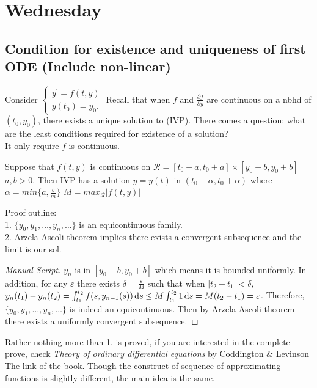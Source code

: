 

\section{Wednesday}
\subsection{Condition for existence and uniqueness of first ODE (Include non-linear)}Consider $\left \{	\begin{gathered}
y^\prime=f(t,y)	\\
y(t_0)=y_0.
\end{gathered}\right.$ Recall that when $f$ and $\frac{\partial f}{\partial y}$ are continuous on a nbhd of $(t_0,y_0)$, there exists a unique solution to (IVP).
There comes a question: what are the least conditions required for existence of a solution?\\ It only require $f$ is continuous.\\
\begin{theorem}
Suppose that $f(t,y)$ is continuous on $\mathcal{R}=[t_0-a,t_0+a]\times[y_0-b,y_0+b]$ $a,b>0$. Then IVP has a solution $y=y(t)$ in $(t_0-\alpha,t_0+\alpha)$ where $\alpha=min\{a,\frac{b}{m}\}$ $M=max_\mathcal{R}|f(t,y)|$
\end{theorem}

Proof outline:\\
1. $\{y_0, y_1, \dots, y_n,\dots\}$ is an equicontinuous family.\\
2. Arzela-Ascoli theorem implies there exists a convergent subsequence and the limit is our sol.

\begin{proof}[Manual Script]
$y_n$ is in $[y_0-b,y_0+b]$ which means it is bounded uniformly. In addition, for any $\varepsilon$ there exists $\delta=\frac{\varepsilon}{M}$ such that when $|t_2-t_1|<\delta$, $y_n(t_1)-y_n(t_2)=\int_{t_1}^{t_2}f(s,y_{n-1}(s))\,\mathrm{d} s\leq M\int_{t_1}^{t_2}1\,\mathrm{d} s=M(t_2-t_1)=\varepsilon$. Therefore, $\{y_0,y_1,\dots,y_n,\dots\}$ is indeed an equicontinuous. Then by Arzela-Ascoli theorem there exists a uniformly convergent subsequence.
\end{proof}
Rather nothing more than 1. is proved, if you are interested in the complete prove, check {\it Theory of ordinary differential equations} by Coddington \& Levinson \href{https://ptvtpqa.files.wordpress.com/2013/12/coddington-e-levinson-n-theory-of-ordinary-differential-equations.pdf}{The link of the book}.
Though the construct of sequence of approximating functions is slightly different, the main idea is the same.\\

